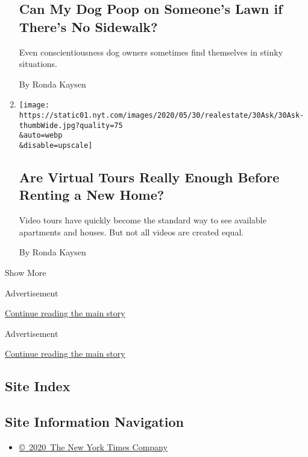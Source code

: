 \begin{enumerate}
{  \subsection{Can My Dog Poop on Someone's Lawn if There's No
  Sidewalk?}\label{can-my-dog-poop-on-someones-lawn-if-theres-no-sidewalk}}

  Even conscientiousness dog owners sometimes find themselves in stinky
  situations.

  By Ronda Kaysen
\item
  \href{/2020/05/30/realestate/virtual-tours-renting-coronavirus.html}{}

  \texttt{[image: https://static01.nyt.com/images/2020/05/30/realestate/30Ask/30Ask-thumbWide.jpg?quality=75\\\&auto=webp\\\&disable=upscale]}

  \hypertarget{are-virtual-tours-really-enough-before-renting-a-new-home}{%
  \subsection{Are Virtual Tours Really Enough Before Renting a New
  Home?}\label{are-virtual-tours-really-enough-before-renting-a-new-home}}

  Video tours have quickly become the standard way to see available
  apartments and houses. But not all videos are created equal.

  By Ronda Kaysen
\end{enumerate}

Show More

Advertisement

\protect\hyperlink{after-mid1}{Continue reading the main story}

Advertisement

\protect\hyperlink{after-mktg}{Continue reading the main story}

\hypertarget{site-index}{%
\subsection{Site Index}\label{site-index}}

\hypertarget{site-information-navigation}{%
\subsection{Site Information
Navigation}\label{site-information-navigation}}

\begin{itemize}
\tightlist
\item
  \href{https://help.nytimes.com/hc/en-us/articles/115014792127-Copyright-notice}{©~2020~The
  New York Times Company}
\end{itemize}

